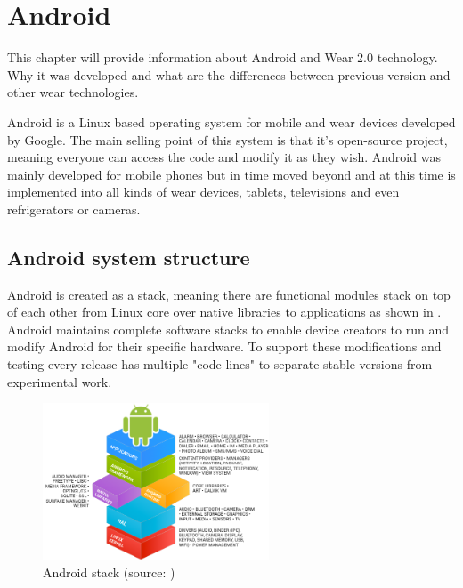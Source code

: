\chapter{Android}\label{sec:Android}
This chapter will provide information about Android and Wear 2.0 technology. Why it was developed and what are the differences between previous version and other wear technologies.

\medskip

Android is a Linux based operating system for mobile and wear devices developed by Google. The main selling point of this system is that it's open-source project, meaning everyone can access the code and modify it as they wish. Android was mainly developed for mobile phones but in time moved beyond and at this time is implemented into all kinds of wear devices, tablets, televisions and even refrigerators or cameras.\cite{WIGA}

\section{Android system structure}\label{sec:AndroidSystemStructure}
Android is created as a stack, meaning there are functional modules stack on top of each other from Linux core over native libraries to applications as shown in . Android maintains complete software stacks to enable device creators to run and modify Android for their specific hardware. To support these modifications and testing every release has multiple "code lines" to separate stable versions from experimental work.\cite{AOSP}

\begin{figure}[H]
	\begin{centering}
		\includegraphics[width=0.6\textwidth]{img/android_stack}
		\par\end{centering}
	\caption{Android stack (source: \cite{AOSP})\label{fig:AndroidStack}}
	\label{fig6}
\end{figure}

